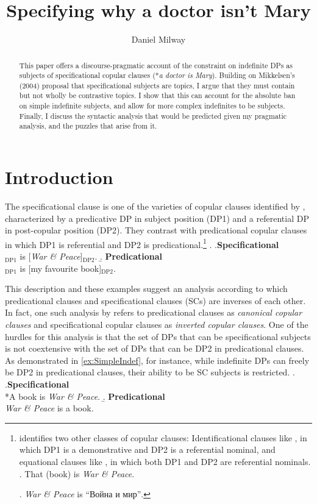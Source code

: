 \documentclass[letterpaper]{article}
\title{Specifying why a doctor isn't Mary}
\author{Daniel Milway%
}
\date{}
\begin{document}
\maketitle
\begin{abstract}
  This paper offers a discourse-pragmatic account of the constraint on indefinite DPs as subjects of specificational copular clauses (*\textit{a doctor is Mary}).
  Building on Mikkelsen's (2004) proposal that specificational subjects are topics, I argue that they must contain but not wholly be contrastive topics.
  I show that this can account for the absolute ban on simple indefinite subjects, and allow for more complex indefinites to be subjects.
  Finally, I discuss the syntactic analysis that would be predicted given my pragmatic analysis, and the puzzles that arise from it.
\end{abstract}
\doublespacing
\section{Introduction}
The specificational clause is one of the varieties of copular clauses identified by \textcite{higgins1973pseudo}, characterized by a predicative DP in subject position (DP1) and a referential DP in post-copular position (DP2).
They contrast with predicational copular clauses in which DP1 is referential and DP2 is predicational.\footnote{
	\textcite{higgins1973pseudo} identifies two other classes of copular clauses:
	Identificational clauses like \Next, in which DP1 is a demonstrative and DP2 is a referential nominal, and equational clauses like \NNext, in which both DP1 and DP2 are referential nominals.
	\ex. That (book) is \textit{War \& Peace}.

	\ex. \textit{War \& Peace} is \foreignlanguage{russian}{``Война и мир''}.

}
\ex.
\a.\textbf{Specificational}\\
[My favourite book]$_{\text{DP1}}$ is [\textit{War \& Peace}]$_{\text{DP2}}$.
\b. \textbf{Predicational}\\
[\textit{War \& Peace}]$_{\text{DP1}}$ is [my favourite book]$_{\text{DP2}}$.

This description and these examples suggest an analysis according to which predicational clauses and specificational clauses (SCs) are inverses of each other.
In fact, one such analysis by \textcite{moro1997raising} refers to predicational clauses as \textit{canonical copular clauses} and specificational copular clauses as \textit{inverted copular clauses}.
One of the hurdles for this analysis is that the set of DPs that can be specificational subjects is not coextensive with the set of DPs that can be DP2 in predicational clauses.
As demonstrated in \ref{ex:SimpleIndef}, for instance, while indefinite DPs can freely be DP2 in predicational clauses, their ability to be SC subjects is restricted. 
\ex.\label{ex:SimpleIndef}
\a.\textbf{Specificational}\\
*A book is \textit{War \& Peace}.
\b. \textbf{Predicational}\\
\textit{War \& Peace} is a book.
\end{document}

